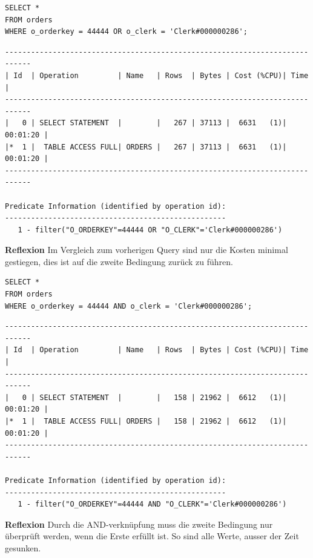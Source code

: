 \documentclass[10pt]{article}
\begin{document}
\begin{lstlisting}[style=sql]
SELECT *
FROM orders
WHERE o_orderkey = 44444 OR o_clerk = 'Clerk#000000286';
\end{lstlisting}
\begin{lstlisting}[style=queryexecutionplan]
----------------------------------------------------------------------------
| Id  | Operation         | Name   | Rows  | Bytes | Cost (%CPU)| Time     |
----------------------------------------------------------------------------
|   0 | SELECT STATEMENT  |        |   267 | 37113 |  6631   (1)| 00:01:20 |
|*  1 |  TABLE ACCESS FULL| ORDERS |   267 | 37113 |  6631   (1)| 00:01:20 |
----------------------------------------------------------------------------

Predicate Information (identified by operation id):
---------------------------------------------------
   1 - filter("O_ORDERKEY"=44444 OR "O_CLERK"='Clerk#000000286')
\end{lstlisting}
\textbf{Reflexion} \newline
Im Vergleich zum vorherigen Query sind nur die Kosten minimal gestiegen, dies 
ist auf die zweite Bedingung zurück zu führen.

\newpage
\begin{lstlisting}[style=sql]
SELECT *
FROM orders
WHERE o_orderkey = 44444 AND o_clerk = 'Clerk#000000286';
\end{lstlisting}
\begin{lstlisting}[style=queryexecutionplan]
----------------------------------------------------------------------------
| Id  | Operation         | Name   | Rows  | Bytes | Cost (%CPU)| Time     |
----------------------------------------------------------------------------
|   0 | SELECT STATEMENT  |        |   158 | 21962 |  6612   (1)| 00:01:20 |
|*  1 |  TABLE ACCESS FULL| ORDERS |   158 | 21962 |  6612   (1)| 00:01:20 |
----------------------------------------------------------------------------

Predicate Information (identified by operation id):
---------------------------------------------------
   1 - filter("O_ORDERKEY"=44444 AND "O_CLERK"='Clerk#000000286')
\end{lstlisting}
\textbf{Reflexion} \newline
Durch die AND-verknüpfung muss die zweite Bedingung nur überprüft werden, wenn 
die Erste erfüllt ist. So sind alle Werte, ausser der Zeit gesunken.
\end{document}

